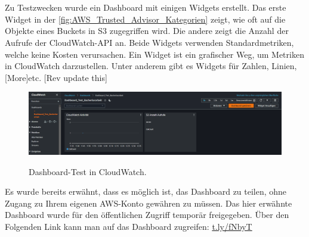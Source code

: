 \\\\
Zu Testzwecken wurde ein Dashboard mit einigen Widgets erstellt. Das erste Widget in der \autoref{fig:AWS_Trusted_Advisor_Kategorien} zeigt, wie oft auf die Objekte eines Buckets in S3 zugegriffen wird. Die andere zeigt die Anzahl der Aufrufe der CloudWatch-API an. Beide Widgets verwenden Standardmetriken, welche keine Kosten verursachen. Ein Widget ist ein grafischer Weg, um Metriken in CloudWatch darzustellen. Unter anderem gibt es Widgets für Zahlen, Linien, [More]etc.
[Rev update this]
\begin{figure}[h!]
  \centering
  \includegraphics[scale=0.4]{sources/CloudWatchDashboardTest}
  \caption[Dashboard-Test in CloudWatch]{}
  \label{fig:CloudWatchDashboardTest} 
  Dashboard-Test in CloudWatch.
\end{figure}
Es wurde bereits erwähnt, dass es möglich ist, das Dashboard zu teilen, ohne Zugang zu Ihrem eigenen AWS-Konto gewähren zu müssen. Das hier erwähnte Dashboard wurde für den öffentlichen Zugriff temporär freigegeben. Über den Folgenden Link kann man auf das Dashboard zugreifen: \url{t.ly/fNbyT} %


